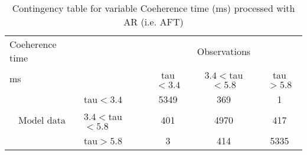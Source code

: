 
\begin{table}[]
\begin{center}
\begin{tabular}{llccc}
\hline
{Coeherence time}                                       &                                                    & \multicolumn{3}{c}{Observations}                 \\
{ms}                                       &                             & tau$<3.4$   & $3.4<$tau$<5.8$ & tau$>5.8$ \\
\hline
\multicolumn{1}{c}{\multirow{3}{*}{Model data}}  & tau$<3.4$          & 5349                & 369                       & 1              \\
                                                 & $3.4<$tau$<5.8$ & 401                & 4970                       & 417              \\
                                                 & tau$>5.8$          & 3                & 414                       & 5335              \\
\hline
\end{tabular}
\end{center}
\caption{Contingency table for variable Coeherence time (ms) processed with AR (i.e. AFT)}
\label{tab:contingency}
\end{table}
